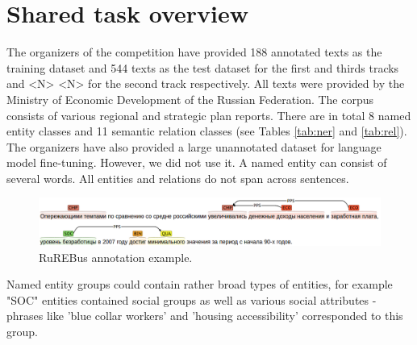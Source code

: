 \documentclass{dialogue}
\begin{document}
\section{Shared task overview}
The organizers of the competition have provided 188 annotated texts as the training dataset and 544 texts as the test dataset for the first and thirds tracks and <N> <N> for the second track respectively. All texts were provided by the Ministry of Economic Development of the Russian Federation. The corpus consists of various regional and strategic plan reports. There are in total 8 named entity classes and 11 semantic relation classes (see Tables \ref{tab:ner} and \ref{tab:rel}). The organizers have also provided a large unannotated dataset for language model fine-tuning. However, we did not use it. A named entity can consist of several words. All entities and relations do not span across sentences.

\begin{figure}[thb]
	\centering
	\includegraphics[scale=0.4]{pics/brat}
	\caption{RuREBus annotation example.}
	\label{fig:brat}
\end{figure}

 
Named entity groups could contain rather broad types of entities, for example "SOC" entities contained social groups as well as various social attributes - phrases like 'blue collar workers' and 'housing accessibility' corresponded to this group.
\end{document}

